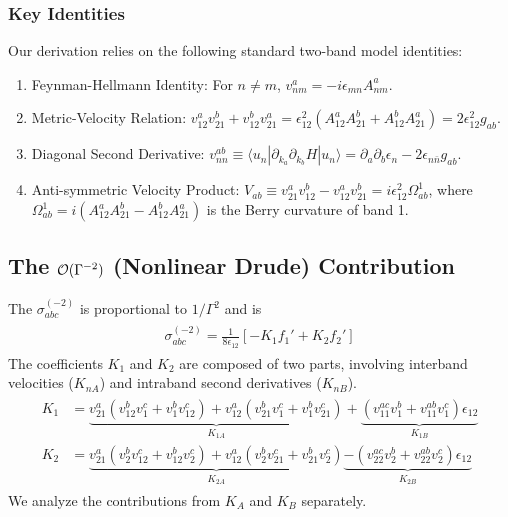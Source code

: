 \documentclass[twocolumn, prx, reprint, amsfonts, amsmath, amssymb, longbibliography, floatfix, aps]{revtex4-2}
\begin{document}
\subsubsection*{Key Identities}
Our derivation relies on the following standard two-band model identities:
\begin{enumerate}
    \item Feynman-Hellmann Identity: For $n \neq m$, $v_{nm}^a = -i \epsilon_{mn} A_{nm}^a$.
    \item Metric-Velocity Relation: $v_{12}^a v_{21}^b + v_{12}^b v_{21}^a = \epsilon_{12}^2 (A_{12}^a A_{21}^b + A_{12}^b A_{21}^a) = 2\epsilon_{12}^2 g_{ab}$.
    \item Diagonal Second Derivative: $v_{nn}^{ab} \equiv \langle u_n | \partial_{k_a}\partial_{k_b} H | u_n \rangle = \partial_a \partial_b \epsilon_n - 2\epsilon_{n\bar{n}} g_{ab}$.
    \item Anti-symmetric Velocity Product: $V_{ab} \equiv v_{21}^a v_{12}^b - v_{12}^a v_{21}^b = i \epsilon_{12}^2 \Omega_{ab}^1$, where $\Omega_{ab}^1 = i (A_{12}^a A_{21}^b - A_{12}^b A_{21}^a)$ is the Berry curvature of band 1.
\end{enumerate}


\subsection{The \texorpdfstring{${\cal O}(\Gamma^{-2})$}{O(Gamma-2)} (Nonlinear Drude) Contribution}


The $\sigma_{abc}^{(-2)}$ is proportional to $1/\Gamma^2$ and is
\begin{align}
\begin{aligned}
\sigma_{abc}^{(-2)} = \frac{1}{8\epsilon_{12}} [ -K_1 f_1' + K_2 f_2' ]
\end{aligned}
\end{align}
The coefficients $K_1$ and $K_2$ are composed of two parts, involving interband velocities ($K_{nA}$) and intraband second derivatives ($K_{nB}$).
\begin{align}
\begin{aligned}
K_1 &= \underbrace{v_{21}^a(v_{12}^b v_1^c + v_1^b v_{12}^c) + v_{12}^a(v_{21}^b v_1^c + v_1^b v_{21}^c)}_{K_{1A}} + \underbrace{(v_{11}^{ac} v_1^b + v_{11}^{ab} v_1^c)\epsilon_{12}}_{K_{1B}} \\
K_2 &= \underbrace{v_{21}^a(v_2^b v_{12}^c + v_{12}^b v_2^c) + v_{12}^a(v_2^b v_{21}^c + v_{21}^b v_2^c)}_{K_{2A}} \underbrace{- (v_{22}^{ac} v_2^b + v_{22}^{ab} v_2^c)\epsilon_{12}}_{K_{2B}}
\end{aligned}
\end{align}
We analyze the contributions from $K_A$ and $K_B$ separately.
\end{document}
